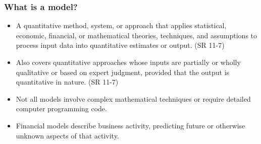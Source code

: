 \documentclass[11pt]{beamer}
\begin{document}
\begin{frame}
\frametitle{What is a model?}
\begin{itemize}
	\item A quantitative method, system, or approach that applies statistical, economic, financial, or mathematical theories, techniques, and assumptions to process input data into quantitative estimates or output. (SR 11-7)
	\item Also covers quantitative approaches whose inputs are partially or wholly qualitative or based on expert judgment, provided that the output is quantitative in nature. (SR 11-7)
	\item Not all models involve complex mathematical techniques or require detailed computer programming code.
	\item Financial models describe business activity, predicting future or otherwise unknown aspects of that activity. 
\end{itemize}
\end{frame}
\end{document}
